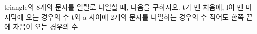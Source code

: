 triangle의 $8$개의 문자를 일렬로 나열할 때, 다음을 구하시오.
 t가 맨 처음에, l이 맨 마지막에 오는 경우의 수
 t와 a 사이에 $2$개의 문자를 나열하는 경우의 수
 적어도 한쪽 끝에 자음이 오는 경우의 수
